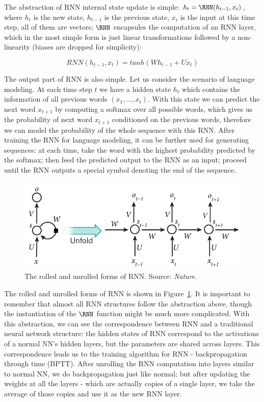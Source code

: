 The abstraction of RNN internal state update is simple: $h_t=\RNN(h_{t-1}, x_t)$, where $h_t$ is the new state, $h_{t-1}$ is the previous state, $x_i$ is the input at this time step, all of them are vectors; $\RNN$ encapsules the computation of an RNN layer, which in the most simple form is just linear transformations followed by a non-linearity (biases are dropped for simplicity):

$$RNN(h_{t-1}, x_t) = tanh(Wh_{t-1} + Ux_t)$$

The output part of RNN is also simple. Let us consider the scenario of language modeling. At each time step $t$ we have a hidden state $h_t$ which contains the information of all previous words $(x_1, ..., x_t)$. With this state we can predict the next word $x_{t+1}$ by computing a softmax over all possible words, which gives us the probability of next word $x_{t+1}$ conditioned on the previous words, therefore we can model the probability of the whole sequence with this RNN. After training the RNN for language modeling, it can be further used for generating sequences: at each time, take the word with the highest probability predicted by the softmax; then feed the predicted output to the RNN as an input; proceed until the RNN outputs a special symbol denoting the end of the sequence.

\begin{figure}
\centering
\includegraphics[width=0.7\columnwidth]{figures/methods/RNN}
\caption{The rolled and unrolled forms of RNN. Source: \emph{Nature}.}
\label{fig:methods:RNN}
\end{figure}

The rolled and unrolled forms of RNN is shown in Figure~\ref{fig:methods:RNN}. It is important to remember that almost all RNN structures follow the abstraction above, though the instantiation of the $\RNN$ function might be much more complicated. With this abstraction, we can see the correspondence between RNN and a traditional neural network structure: the hidden states of RNN correspond to the activations of a normal NN's hidden layers, but the parameters are shared across layers. This correspondence leads us to the training algorithm for RNN - backpropagation through time (BPTT). After unrolling the RNN computation into layers similar to normal NN, we do backpropagation just like normal; but after updating the weights at all the layers - which are actually copies of a single layer, we take the average of those copies and use it as the new RNN layer.

